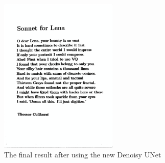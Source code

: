 \documentclass[12pt,a4paper]{article}
\begin{document}
\begin{enumerate}
\begin{figure}
        \label{fig:p4_train2}
    \end{figure}
    \begin{figure}
        \centering
        \includegraphics[width=0.5\textwidth]{src/img/p4_final2.png}
        \caption{The final result after using the new Denoisy UNet}
        \label{fig:p4_final2}
    \end{figure}
    \end{enumerate}
\end{document}
